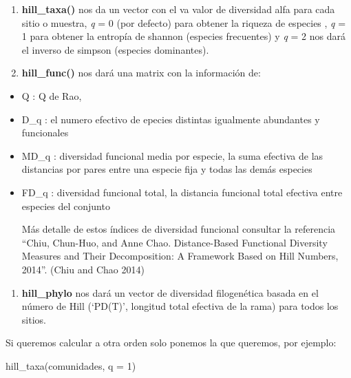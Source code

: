 \documentclass[
]{article}
\newenvironment{Shaded}{\begin{snugshade}}{\end{snugshade}}
\newcommand{\AttributeTok}[1]{\textcolor[rgb]{0.77,0.63,0.00}{#1}}
\newcommand{\DecValTok}[1]{\textcolor[rgb]{0.00,0.00,0.81}{#1}}
\newcommand{\FunctionTok}[1]{\textcolor[rgb]{0.00,0.00,0.00}{#1}}
\newcommand{\NormalTok}[1]{#1}
\providecommand{\tightlist}{%
  \setlength{\itemsep}{0pt}\setlength{\parskip}{0pt}}
\begin{document}
\begin{enumerate}
\def\labelenumi{\arabic{enumi}.}
\item
  \textbf{hill\_taxa()} nos da un vector con el va valor de diversidad
  alfa para cada sitio o muestra, \emph{q} = 0 (por defecto) para
  obtener la riqueza de especies , \emph{q} = 1 para obtener la entropía
  de shannon (especies frecuentes) y \emph{q} = 2 nos dará el inverso de
  simpson (especies dominantes).\\
\item
  \textbf{hill\_func()} nos dará una matrix con la información de:
\end{enumerate}

\begin{itemize}
\item
  Q : Q de Rao,
\item
  D\_q : el numero efectivo de epecies distintas igualmente abundantes y
  funcionales
\item
  MD\_q : diversidad funcional media por especie, la suma efectiva de
  las distancias por pares entre una especie fija y todas las demás
  especies
\item
  FD\_q : diversidad funcional total, la distancia funcional total
  efectiva entre especies del conjunto

  Más detalle de estos índices de diversidad funcional consultar la
  referencia ``Chiu, Chun-Huo, and Anne Chao. Distance-Based Functional
  Diversity Measures and Their Decomposition: A Framework Based on Hill
  Numbers, 2014''. (Chiu and Chao 2014)\\
\end{itemize}

\begin{enumerate}
\def\labelenumi{\arabic{enumi}.}
\setcounter{enumi}{2}
\tightlist
\item
  \textbf{hill\_phylo} nos dará un vector de diversidad filogenética
  basada en el número de Hill (`PD(T)', longitud total efectiva de la
  rama) para todos los sitios.
\end{enumerate}

Si queremos calcular a otra orden solo ponemos la que queremos, por
ejemplo:

\begin{Shaded}
\begin{Highlighting}[]
\FunctionTok{hill\_taxa}\NormalTok{(comunidades, }\AttributeTok{q =} \DecValTok{1}\NormalTok{)}
\end{Highlighting}
\end{Shaded}
\end{document}
